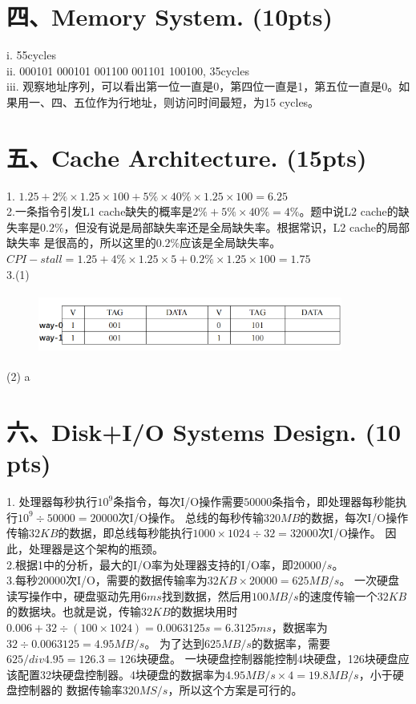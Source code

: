 \documentclass[UTF8]{ctexart}
\begin{document}
\section*{四、Memory System. (10pts)}
i. 55cycles\\
ii. 000101 000101 001100 001101 100100, 35cycles\\
iii. 观察地址序列，可以看出第一位一直是0，第四位一直是1，第五位一直是0。如果用一、四、五位作为行地址，则访问时间最短，为15 cycles。\\

\section*{五、Cache Architecture. (15pts)}
1. $1.25+2\%\times1.25\times100+5\%\times40\%\times1.25\times100=6.25$\\
2.一条指令引发L1 cache缺失的概率是$2\%+5\%\times40\%=4\%$。题中说L2 cache的缺失率是$0.2\%$，但没有说是局部缺失率还是全局缺失率。根据常识，L2 cache的局部缺失率
是很高的，所以这里的$0.2\%$应该是全局缺失率。\\
$CPI-stall=1.25+4\%\times1.25\times5+0.2\%\times1.25\times100=1.75$\\
3.(1)
\begin{figure}[H]                                            
    \centering                                                
    \includegraphics[width=10cm,height=2cm]{5-3.png}        
    \caption*{}                                                                                 
\end{figure}  
(2) a
\section*{六、Disk+I/O Systems Design. (10 pts)}
1. 处理器每秒执行$10^9$条指令，每次I/O操作需要$50000$条指令，即处理器每秒能执行$10^9\div50000=20000$次I/O操作。
总线的每秒传输$320MB$的数据，每次I/O操作传输$32KB$的数据，即总线每秒能执行$1000\times1024\div32=32000$次I/O操作。
因此，处理器是这个架构的瓶颈。\\
2.根据1中的分析，最大的I/O率为处理器支持的I/O率，即$20000/s$。\\
3.每秒$20000$次I/O，需要的数据传输率为$32KB\times20000=625MB/s$。
一次硬盘读写操作中，硬盘驱动先用$6ms$找到数据，然后用$100MB/s$的速度传输一个$32KB$的数据块。也就是说，传输$32KB$的数据块用时
$0.006+32\div(100\times1024)=0.0063125s=6.3125ms$，数据率为$32\div0.0063125=4.95MB/s$。
为了达到$625MB/s$的数据率，需要$625/div4.95=126.3=126$块硬盘。
一块硬盘控制器能控制4块硬盘，126块硬盘应该配置32块硬盘控制器。4块硬盘的数据率为$4.95MB/s\times4=19.8MB/s$，小于硬盘控制器的
数据传输率$320MS/s$，所以这个方案是可行的。
\end{document}
